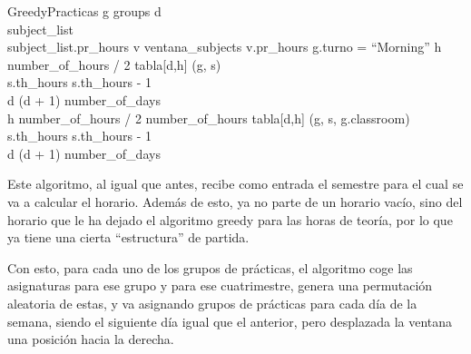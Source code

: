 \begin{pseudocode}{GreedyPracticas}{ }
    \label{greedypracticas}
    \FOREACH g \in groups \DO
    \BEGIN
        d  \\
        subject\_list \GETS {}\\
        \WHILE \sum subject\_list.pr\_hours  \DO
        \BEGIN
            \FOREACH v \in ventana\_subjects \DO
            \BEGIN
                \IF v.pr\_hours  \DO
                \BEGIN
                    \IF g.turno = ``Morning'' \DO
                    \BEGIN
                        \FOR h  \TO number\_of\_hours / 2 \DO
                        \BEGIN
                            \IF {} \DO
                            \BEGIN
                                tabla[d,h] \GETS (g, s)\\
                                s.th\_hours \GETS s.th\_hours - 1\\
                                d \GETS (d + 1) \bmod number\_of\_days\\
                                \BREAK
                            \END
                        \END
                    \END
                    \ELSE \DO
                    \BEGIN
                        \FOR h \GETS number\_of\_hours / 2 \TO number\_of\_hours \DO
                        \BEGIN
                            \IF {} \DO
                            \BEGIN
                                tabla[d,h] \GETS (g, s, g.classroom)\\
                                s.th\_hours \GETS s.th\_hours - 1\\
                                d \GETS (d + 1) \bmod number\_of\_days\\
                                \BREAK
                            \END
                        \END
                    \END
                \END
            \END
        \END
    \END
\end{pseudocode}

Este algoritmo, al igual que antes, recibe como entrada el semestre para el cual se va a calcular el horario. Además de esto, ya no parte de un horario vacío, sino del horario que le ha dejado el algoritmo greedy para las horas de teoría, por lo que ya tiene una cierta ``estructura'' de partida.

Con esto, para cada uno de los grupos de prácticas, el algoritmo coge las asignaturas para ese grupo y para ese cuatrimestre, genera una permutación aleatoria de estas, y va asignando grupos de prácticas para cada día de la semana, siendo el siguiente día igual que el anterior, pero desplazada la ventana una posición hacia la derecha.

